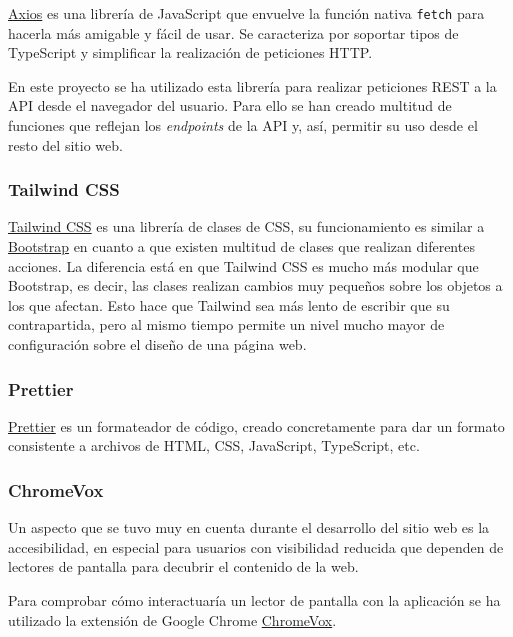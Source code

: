 \href{https://github.com/axios/axios}{Axios} es una librería de JavaScript que
envuelve la función nativa \texttt{fetch} para hacerla más amigable y fácil de
usar. Se caracteriza por soportar tipos de TypeScript y simplificar la
realización de peticiones HTTP.

En este proyecto se ha utilizado esta librería para realizar peticiones REST a
la API desde el navegador del usuario. Para ello se han creado multitud de
funciones que reflejan los \textit{endpoints} de la API y, así, permitir su uso
desde el resto del sitio web.

\subsubsection{Tailwind CSS}

\href{https://tailwindcss.com/}{Tailwind CSS} es una librería de clases de CSS,
su funcionamiento es similar a \href{https://getbootstrap.com/}{Bootstrap} en
cuanto a que existen multitud de clases que realizan diferentes acciones. La
diferencia está en que Tailwind CSS es mucho más modular que Bootstrap, es
decir, las clases realizan cambios muy pequeños sobre los objetos a los que
afectan. Esto hace que Tailwind sea más lento de escribir que su contrapartida,
pero al mismo tiempo permite un nivel mucho mayor de configuración sobre el
diseño de una página web.

\subsubsection{Prettier}

\href{https://prettier.io/}{Prettier} es un formateador de código, creado
concretamente para dar un formato consistente a archivos de HTML, CSS,
JavaScript, TypeScript, etc.

\subsubsection{ChromeVox}

Un aspecto que se tuvo muy en cuenta durante el desarrollo del sitio web es la
accesibilidad, en especial para usuarios con visibilidad reducida que dependen
de lectores de pantalla para decubrir el contenido de la web.

Para comprobar cómo interactuaría un lector de pantalla con la aplicación se ha
utilizado la extensión de Google Chrome
\href{https://chrome.google.com/webstore/detail/screen-reader/kgejglhpjiefppelpmljglcjbhoiplfn}{ChromeVox}.
